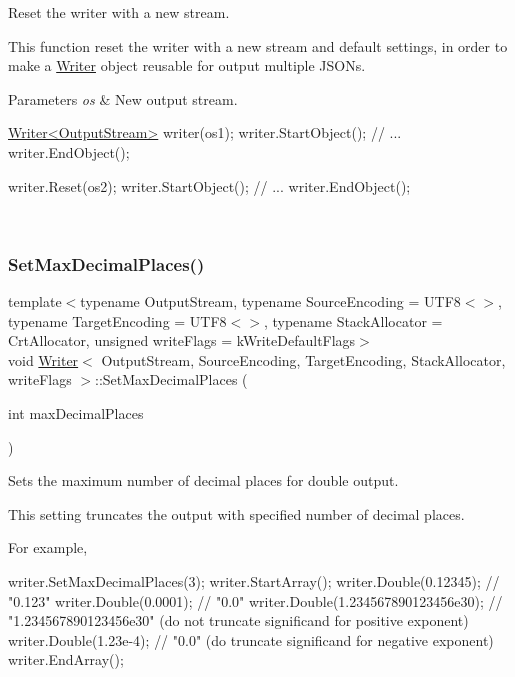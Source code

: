 Reset the writer with a new stream. 

This function reset the writer with a new stream and default settings, in order to make a \hyperlink{a02224}{Writer} object reusable for output multiple J\+S\+O\+Ns.


\begin{DoxyParams}{Parameters}
{\em os} & New output stream. 
\begin{DoxyCode}
\hyperlink{a02224}{Writer<OutputStream>} writer(os1);
writer.StartObject();
\textcolor{comment}{// ...}
writer.EndObject();

writer.Reset(os2);
writer.StartObject();
\textcolor{comment}{// ...}
writer.EndObject();
\end{DoxyCode}
 \\
\hline
\end{DoxyParams}
\mbox{\label{a02224_a58e3f94dc5af1432a8eace5ba427eca7}} 
\subsubsection{\texorpdfstring{Set\+Max\+Decimal\+Places()}{SetMaxDecimalPlaces()}}
{\footnotesize\ttfamily template$<$typename Output\+Stream, typename Source\+Encoding = U\+T\+F8$<$$>$, typename Target\+Encoding = U\+T\+F8$<$$>$, typename Stack\+Allocator = Crt\+Allocator, unsigned write\+Flags = k\+Write\+Default\+Flags$>$ \\
void \hyperlink{a02224}{Writer}$<$ Output\+Stream, Source\+Encoding, Target\+Encoding, Stack\+Allocator, write\+Flags $>$\+::Set\+Max\+Decimal\+Places (\begin{DoxyParamCaption}\item[{int}]{max\+Decimal\+Places }\end{DoxyParamCaption})\hspace{0.3cm}{\ttfamily [inline]}}



Sets the maximum number of decimal places for double output. 

This setting truncates the output with specified number of decimal places.

For example,


\begin{DoxyCode}
writer.SetMaxDecimalPlaces(3);
writer.StartArray();
writer.Double(0.12345);                 \textcolor{comment}{// "0.123"}
writer.Double(0.0001);                  \textcolor{comment}{// "0.0"}
writer.Double(1.234567890123456e30);    \textcolor{comment}{// "1.234567890123456e30" (do not truncate significand for positive
       exponent)}
writer.Double(1.23e-4);                 \textcolor{comment}{// "0.0"                  (do truncate significand for negative
       exponent)}
writer.EndArray();
\end{DoxyCode}


